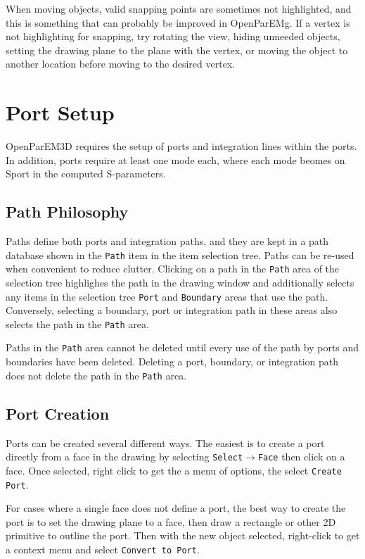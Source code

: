 \documentclass[titlepage]{article}
\renewcommand\_{\textunderscore\linebreak[1]}
\begin{document}
When moving objects, valid snapping points are sometimes not highlighted, and this is something that can probably be improved in OpenParEMg.  If a vertex is not highlighting for snapping, try rotating the view, hiding unneeded objects, setting the drawing plane to the plane with the vertex, or moving the object to another location before moving to the desired vertex.

\section{Port Setup}

OpenParEM3D requires the setup of ports and integration lines within the ports.  In addition, ports require at least one mode each, where each mode beomes on Sport in the computed S-parameters.

\subsection{Path Philosophy}

Paths define both ports and integration paths, and they are kept in a path database shown in the \texttt{Path} item in the item selection tree.  Paths can be re-used when convenient to reduce clutter.  Clicking on a path in the \texttt{Path} area of the selection tree highlighes the path in the drawing window and additionally selects any items in the selection tree \texttt{Port} and \texttt{Boundary} areas that use the path.  Conversely, selecting a boundary, port or integration path in these areas also selects the path in the \texttt{Path} area.

Paths in the \texttt{Path} area cannot be deleted until every use of the path by ports and boundaries have been deleted.  Deleting a port, boundary, or integration path does not delete the path in the \texttt{Path} area.

\subsection{Port Creation}

Ports can be created several different ways.  The easiest is to create a port directly from a face in the drawing by selecting \texttt{Select}$\rightarrow$\texttt{Face} then click on a face.  Once selected, right click to get the a menu of options, the select \texttt{Create Port}.

For cases where a single face does not define a port, the best way to create the port is to set the drawing plane to a face, then draw a rectangle or other 2D primitive to outline the port.  Then with the new object selected, right-click to get a context menu and select \texttt{Convert to Port}.
\end{document}
